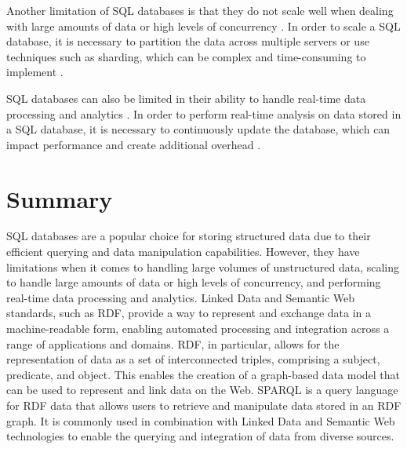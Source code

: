 Another limitation of SQL databases is that they do not scale well when dealing with large amounts of data or high levels of concurrency \citep*{kleppmann2019designing,chen2014data}.  In order to scale a SQL database, it is necessary to partition the data across multiple servers or use techniques such as sharding, which can be complex and time-consuming to implement \citep*{ramez2016fundamentals}.

SQL databases can also be limited in their ability to handle real-time data processing and analytics \citep*{kleppmann2019designing,chen2014data}.  In order to perform real-time analysis on data stored in a SQL database, it is necessary to continuously update the database, which can impact performance and create additional overhead \citep*{garcia2008database}.

\section{Summary}

SQL databases are a popular choice for storing structured data due to their efficient querying and data manipulation capabilities.  However, they have limitations when it comes to handling large volumes of unstructured data, scaling to handle large amounts of data or high levels of concurrency, and performing real-time data processing and analytics.  Linked Data and Semantic Web standards, such as RDF, provide a way to represent and exchange data in a machine-readable form, enabling automated processing and integration across a range of applications and domains.  RDF, in particular, allows for the representation of data as a set of interconnected triples, comprising a subject, predicate, and object.  This enables the creation of a graph-based data model that can be used to represent and link data on the Web.  SPARQL is a query language for RDF data that allows users to retrieve and manipulate data stored in an RDF graph.  It is commonly used in combination with Linked Data and Semantic Web technologies to enable the querying and integration of data from diverse sources.
